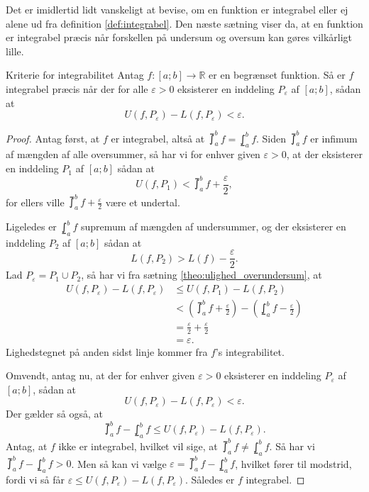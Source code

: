Det er imidlertid lidt vanskeligt at bevise, om en funktion er integrabel eller ej alene ud fra definition \ref{def:integrabel}.
Den næste sætning viser da, at en funktion er integrabel præcis når forskellen på undersum og oversum kan gøres vilkårligt lille.

\begin{theorem}[label=theo:integrabilitetskriterie]{Kriterie for integrabilitet}{}
  Antag $f:[a;b] \to \mathbb{R}$ er en begrænset funktion. 
  Så er $f$ integrabel præcis når der for alle $\varepsilon >0$ eksisterer en inddeling $P _{\varepsilon }$ af $[a;b]$, sådan at 
  \[
  U(f, P _{\varepsilon }) - L(f, P _{\varepsilon }) < \varepsilon.    
  \] 
\end{theorem}
\begin{proof} 
  Antag først, at $f$ er integrabel, altså at $\upint_{a}^{b} f  =\lowint_{a}^{b} f $.
  Siden $\upint_{a}^{b} f  $ er infimum af mængden af alle oversummer, så har vi for enhver given $\varepsilon >0$, at der eksisterer en inddeling $P_1$ af $[a;b]$ sådan at
  \[
  U(f, P_1) < \upint_{a}^{b} f + \frac{\varepsilon }{2}, 
  \] 
  for ellers ville $\upint_{a}^{b} f + \frac{\varepsilon }{2}  $ være et undertal. 

  \noindent Ligeledes er $\lowint_{a}^{b} f $ supremum af mængden af undersummer, og der eksisterer en inddeling $P_2$ af $[a;b]$ sådan at
  \[
  L(f, P_2) > L(f) - \frac{\varepsilon }{2}.
  \] 
  Lad $P _{\varepsilon }=P_1 \cup P_2$, så har vi fra sætning \ref{theo:ulighed_overundersum}, at 
  \begin{equation*}
  \begin{split}
    U(f, P _{\varepsilon }) - L(f, P _{\varepsilon }) &\leq U(f, P_1) - L(f, P_2)\\
    &<\left(\upint_{a}^{b} f + \frac{\varepsilon }{2}  \right) - \left(\lowint_{a}^{b} f - \frac{\varepsilon }{2} \right) \\
    &=\frac{\varepsilon }{2} + \frac{\varepsilon }{2}\\
    &=\varepsilon. 
  \end{split}
  \end{equation*}
Lighedstegnet på anden sidst linje kommer fra $f$'s integrabilitet.

  Omvendt, antag nu, at der for enhver given $\varepsilon >0$ eksisterer en inddeling $P _{\varepsilon }$ af $[a;b]$, sådan at 
\[
  U(f, P _{\varepsilon }) - L(f, P _{\varepsilon }) < \varepsilon. 
\] 
  Der gælder så også, at 
  \[
  \upint_{a}^{b} f - \lowint_{a}^{b} f \leq U(f, P _{\varepsilon }) - L(f, P _{\varepsilon }).
  \]
Antag, at $f$ ikke er integrabel, hvilket vil sige, at $\upint_{a}^{b} f \neq \lowint_{a}^{b} f $.
Så har vi $\upint_{a}^{b} f - \lowint_{a}^{b} f >0$.
  Men så kan vi vælge $\varepsilon =\upint_{a}^{b} f - \lowint_{a}^{b} f$, hvilket fører til modstrid, fordi vi så får $\varepsilon  \leq U(f, P _{\varepsilon }) - L(f, P _{\varepsilon })$.
  Således er $f$ integrabel. 
\end{proof}

